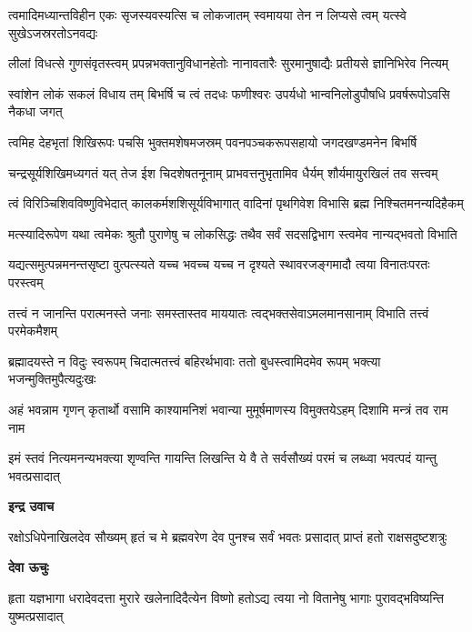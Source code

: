 \fourlineindentedshloka
{त्वमादिमध्यान्तविहीन एकः}
{सृजस्यवस्यत्सि च लोकजातम्}
{स्वमायया तेन न लिप्यसे त्वम्}
{यत्स्वे सुखेऽजस्ररतोऽनवद्यः} %

\fourlineindentedshloka
{लीलां विधत्से गुणसंवृतस्त्वम्}
{प्रपन्नभक्तानुविधानहेतोः}
{नानावतारैः सुरमानुषाद्यैः}
{प्रतीयसे ज्ञानिभिरेव नित्यम्} %

\fourlineindentedshloka
{स्वांशेन लोकं सकलं विधाय तम्}
{बिभर्षि च त्वं तदधः फणीश्वरः}
{उपर्यधो भान्वनिलोडुपौषधि\-}
{प्रवर्षरूपोऽवसि नैकधा जगत्} %

\fourlineindentedshloka
{त्वमिह देहभृतां शिखिरूपः}
{पचसि भुक्तमशेषमजस्रम्}
{पवनपञ्चकरूपसहायो}
{जगदखण्डमनेन बिभर्षि} %

\fourlineindentedshloka
{चन्द्रसूर्यशिखिमध्यगतं यत्}
{तेज ईश चिदशेषतनूनाम्}
{प्राभवत्तनुभृतामिव धैर्यम्}
{शौर्यमायुरखिलं तव सत्त्वम्} %

\fourlineindentedshloka
{त्वं विरिञ्चिशिवविष्णुविभेदात्}
{कालकर्मशशिसूर्यविभागात्}
{वादिनां पृथगिवेश विभासि}
{ब्रह्म निश्चितमनन्यदिहैकम्} %

\fourlineindentedshloka
{मत्स्यादिरूपेण यथा त्वमेकः}
{श्रुतौ पुराणेषु च लोकसिद्धः}
{तथैव सर्वं सदसद्विभाग\-}
{स्त्वमेव नान्यद्भवतो विभाति} %

\fourlineindentedshloka
{यद्यत्समुत्पन्नमनन्तसृष्टा\-}
{वुत्पत्स्यते यच्च भवच्च यच्च}
{न दृश्यते स्थावरजङ्गमादौ}
{त्वया विनातःपरतः परस्त्वम्} %

\fourlineindentedshloka
{तत्त्वं न जानन्ति परात्मनस्ते}
{जनाः समस्तास्तव माययातः}
{त्वद्भक्तसेवाऽमलमानसानाम्}
{विभाति तत्त्वं परमेकमैशम्} %

\fourlineindentedshloka
{ब्रह्मादयस्ते न विदुः स्वरूपम्}
{चिदात्मतत्त्वं बहिरर्थभावाः}
{ततो बुधस्त्वामिदमेव रूपम्}
{भक्त्या भजन्मुक्तिमुपैत्यदुःखः} %

\fourlineindentedshloka
{अहं भवन्नाम गृणन् कृतार्थो}
{वसामि काश्यामनिशं भवान्या}
{मुमूर्षमाणस्य विमुक्तयेऽहम्}
{दिशामि मन्त्रं तव राम नाम} %

\fourlineindentedshloka
{इमं स्तवं नित्यमनन्यभक्त्या}
{शृण्वन्ति गायन्ति लिखन्ति ये वै}
{ते सर्वसौख्यं परमं च लब्ध्वा}
{भवत्पदं यान्तु भवत्प्रसादात्} %

\textbf{इन्द्र उवाच}

\fourlineindentedshloka
{रक्षोऽधिपेनाखिलदेव सौख्यम्}
{हृतं च मे ब्रह्मवरेण देव}
{पुनश्च सर्वं भवतः प्रसादात्}
{प्राप्तं हतो राक्षसदुष्टशत्रुः} %

\textbf{देवा ऊचुः}

\fourlineindentedshloka
{हृता यज्ञभागा धरादेवदत्ता}
{मुरारे खलेनादिदैत्येन विष्णो}
{हतोऽद्य त्वया नो वितानेषु भागाः}
{पुरावद्भविष्यन्ति युष्मत्प्रसादात्} %

